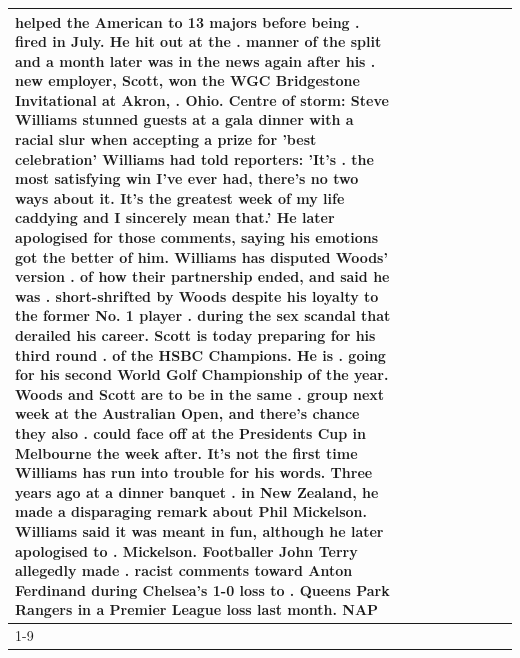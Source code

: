 \begin{table}[H]
\begin{tabular}{lllrlllll}
helped the American to 13 majors before being . fired in July. He hit out at the . manner of the split and a month later was in the news again after his . new employer, Scott, won the WGC Bridgestone Invitational at Akron, . Ohio. Centre of storm: Steve Williams stunned guests at a gala dinner with a racial slur when accepting a prize for 'best celebration' Williams had told reporters: 'It's . the most satisfying win I've ever had, there's no two ways about it. It's the greatest week of my life caddying and I sincerely mean that.' He later apologised for those comments, saying his emotions got the better of him. Williams has disputed Woods' version . of how their partnership ended, and said he was . short-shrifted by Woods despite his loyalty to the former No. 1 player . during the sex scandal that derailed his career. Scott is today preparing for his third round . of the HSBC Champions. He is . going for his second World Golf Championship of the year. Woods and Scott are to be in the same . group next week at the Australian Open, and there's chance they also . could face off at the Presidents Cup in Melbourne the week after. It's not the first time Williams has run into trouble for his words. Three years ago at a dinner banquet . in New Zealand, he made a disparaging remark about Phil Mickelson. Williams said it was meant in fun, although he later apologised to . Mickelson. Footballer John Terry allegedly made . racist comments toward Anton Ferdinand during Chelsea's 1-0 loss to . Queens Park Rangers in a Premier League loss last month. NAP \\
\cline{1-9}

\end{tabular}
\end{table}
